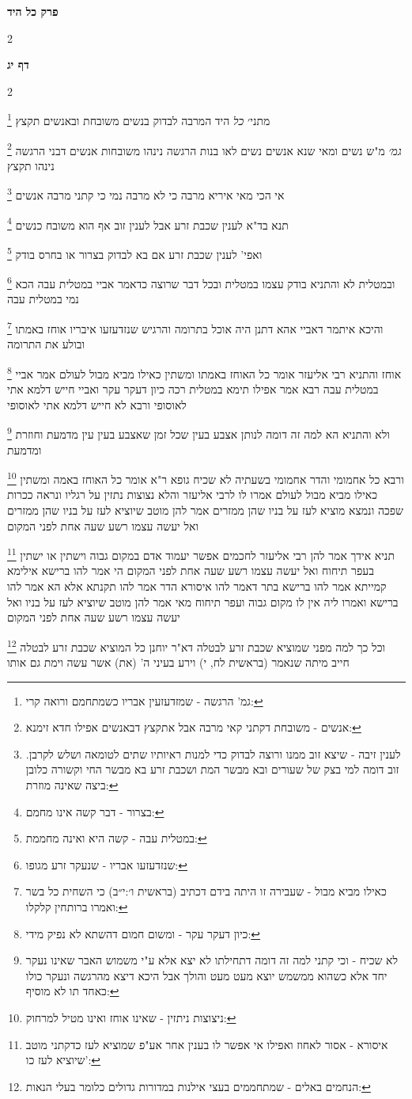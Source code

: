 \documentclass[12pt, openany]{book}
\newcommand{\sethebfont}{
\fontsize{10.5pt}{21.0pt} \selectfont
}
\newcommand{\twocol}[1]{
	{\sethebfont \begin{multicols}{2}
			#1
	\end{multicols}}	
}
\newcommand{\chapname}{}
\newcommand{\sectname}{}
\newcommand{\newchap}[1]{
	\addcontentsline{toc}{chapter}{#1}
	\renewcommand{\chapname}{#1}
		\begin{center}
			\textbf{%
\fontsize{16pt}{16pt}\selectfont
				#1}
		\end{center}
}
\newcommand{\newsection}[1]{
	\renewcommand{\sectname}{#1}	
	\vspace{-\baselineskip}
	\begin{center}
		\textbf{%
\fontsize{16pt}{16pt}\selectfont
			#1}
	\end{center}
	\vspace{-\baselineskip}
	\nopagebreak
}
\newcommand{\footnotecomment}[1]{
	\renewcommand\thefootnote{}
	\footnote{#1}}
\newcommand{\commenta}[1]{\footnotecomment{#1}}
\begin{document}
\newchap{פרק  כל היד}
\twocol{\clearpage}

\newsection{דף יג}
\twocol{
\commenta{גמ' הרגשה - שמזדעזעין אבריו כשמתחמם ורואה קרי:}
מתני׳ {\large\emph{כל}} היד המרבה לבדוק בנשים משובחת ובאנשים תקצץ
\commenta{אנשים - משובחת דקתני קאי מרבה אבל אתקצץ דבאנשים אפילו חדא זימנא:}
{\large\emph{גמ׳}} מ"ש נשים ומאי שנא אנשים נשים לאו בנות הרגשה נינהו משובחות אנשים דבני הרגשה נינהו תקצץ 
\commenta{לענין זיבה - שיצא זוב ממנו ורוצה לבדוק כדי למנות ראיותיו שתים לטומאה ושלש לקרבן. זוב דומה למי בצק של שעורים ובא מבשר המת ושכבת זרע בא מבשר החי וקשורה כלובן ביצה שאינה מוזרת:}
אי הכי מאי איריא מרבה כי לא מרבה נמי כי קתני מרבה אנשים 
\commenta{בצרור - דבר קשה אינו מחמם:}
תנא בד"א לענין שכבת זרע אבל לענין זוב אף הוא משובח כנשים 
\commenta{במטלית עבה - קשה היא ואינה מחממת:}
ואפי' לענין שכבת זרע אם בא לבדוק בצרור או בחרס בודק 
\commenta{שנזדעזעו אבריו - שנעקר זרע מגופו:}
ובמטלית לא והתניא בודק עצמו במטלית ובכל דבר שרוצה כדאמר אביי במטלית עבה הכא נמי במטלית עבה 
\commenta{כאילו מביא מבול - שעבירה זו היתה בידם דכתיב (בראשית ו׳:י״ב) כי השחית כל בשר ואמרו ברותחין קלקלו:}
והיכא איתמר דאביי אהא דתנן היה אוכל בתרומה והרגיש שנזדעזעו איבריו אוחז באמתו ובולע את התרומה 
\commenta{כיון דעקר עקר - ומשום חמום דהשתא לא נפיק מידי:}
אוחז והתניא רבי אליעזר אומר כל האוחז באמתו ומשתין כאילו מביא מבול לעולם אמר אביי במטלית עבה 
רבא אמר אפילו תימא במטלית רכה כיון דעקר עקר ואביי חייש דלמא אתי לאוסופי ורבא לא חייש דלמא אתי לאוסופי
\commenta{לא שכיח - וכי קתני למה זה דומה דתחילתו לא יצא אלא ע"י משמוש האבר שאינו נעקר יחד אלא כשהוא ממשמש יוצא מעט מעט והולך אבל היכא דיצא מהרגשה ונעקר כולו כאחד תו לא מוסיף:}
 ולא והתניא הא למה זה דומה לנותן אצבע בעין שכל זמן שאצבע בעין עין מדמעת וחוזרת ומדמעת 
\commenta{ניצוצות ניתזין - שאינו אוחז ואינו מטיל למרחוק:}
ורבא כל אחמומי והדר אחמומי בשעתיה לא שכיח 
גופא ר"א אומר כל האוחז באמה ומשתין כאילו מביא מבול לעולם אמרו לו לרבי אליעזר והלא נצוצות נתזין על רגליו ונראה ככרות שפכה ונמצא מוציא לעז על בניו שהן ממזרים 
אמר להן מוטב שיוציא לעז על בניו שהן ממזרים ואל יעשה עצמו רשע שעה אחת לפני המקום 
\commenta{איסורא - אסור לאחוז ואפילו אי אפשר לו בענין אחר אע"פ שמוציא לעז כדקתני מוטב שיוציא לעז כו':}
תניא אידך אמר להן רבי אליעזר לחכמים אפשר יעמוד אדם במקום גבוה וישתין או ישתין בעפר תיחוח ואל יעשה עצמו רשע שעה אחת לפני המקום 
הי אמר להו ברישא אילימא קמייתא אמר להו ברישא בתר דאמר להו איסורא הדר אמר להו תקנתא 
אלא הא אמר להו ברישא ואמרו ליה אין לו מקום גבוה ועפר תיחוח מאי אמר להן מוטב שיוציא לעז על בניו ואל יעשה עצמו רשע שעה אחת לפני המקום
\commenta{הנחמים באלים - שמתחממים בעצי אילנות במדורות גדולים כלומר בעלי הנאות:}
וכל כך למה מפני שמוציא שכבת זרע לבטלה דא"ר יוחנן כל המוציא שכבת זרע לבטלה חייב מיתה שנאמר (בראשית לח, י) וירע בעיני ה' (את) אשר עשה וימת גם אותו 
}
\end{document}
